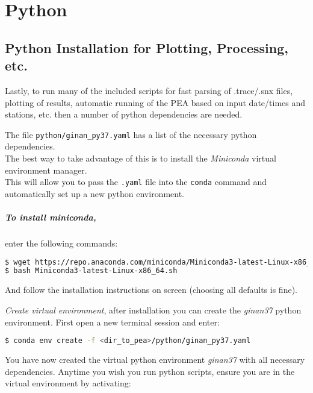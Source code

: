 
\chapter{Python}
\section{Python Installation for Plotting, Processing,
etc.}\label{python-installation-for-plotting-processing-etc.}

Lastly, to run many of the included scripts for fast parsing of
.trace/.snx files, plotting of results, automatic running of the PEA
based on input date/times and stations, etc. then a number of python
dependencies are needed.

The file \texttt{python/ginan\_py37.yaml} has a list of the necessary
python dependencies.\\
The best way to take advantage of this is to install the
\emph{\emph{Miniconda}} virtual environment manager.\\
This will allow you to pass the \texttt{.yaml} file into the
\texttt{conda} command and automatically set up a new python
environment.

\paragraph{To install miniconda,}enter the following commands:

\begin{lstlisting}[language=bash,caption=Installing conda]
$ wget https://repo.anaconda.com/miniconda/Miniconda3-latest-Linux-x86_64.sh
$ bash Miniconda3-latest-Linux-x86_64.sh
\end{lstlisting}

And follow the installation instructions on screen (choosing all
defaults is fine).

\textit{Create virtual environment}, after installation you can create the \emph{ginan37} python environment. First open a new terminal session and enter:

\begin{lstlisting}[language=bash,caption=Example showing how to create a conda environment]
$ conda env create -f <dir_to_pea>/python/ginan_py37.yaml
\end{lstlisting}

You have now created the virtual python environment \emph{ginan37}
with all necessary dependencies. Anytime you wish you run python
scripts, ensure you are in the virtual environment by activating:

